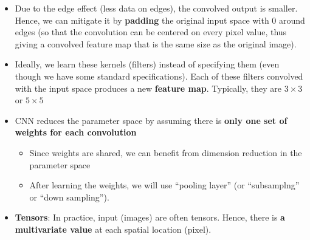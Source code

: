 \documentclass[
]{book}
\begin{document}
\begin{itemize}
\item
  Due to the edge effect (less data on edges), the convolved output is smaller. Hence, we can mitigate it by \textbf{padding} the original input space with 0 around edges (so that the convolution can be centered on every pixel value, thus giving a convolved feature map that is the same size as the original image).
\item
  Ideally, we learn these kernels (filters) instead of specifying them (even though we have some standard specifications). Each of these filters convolved with the input space produces a new \textbf{feature map}. Typically, they are \(3 \times 3\) or \(5 \times 5\)
\item
  CNN reduces the parameter space by assuming there is \textbf{only one set of weights for each convolution}

  \begin{itemize}
  \item
    Since weights are shared, we can benefit from dimension reduction in the parameter space
  \item
    After learning the weights, we will use ``pooling layer'' (or ``subsamplng'' or ``down sampling'').
  \end{itemize}
\item
  \textbf{Tensors}: In practice, input (images) are often tensors. Hence, there is \textbf{a multivariate value} at each spatial location (pixel).


\end{itemize}
\end{document}
